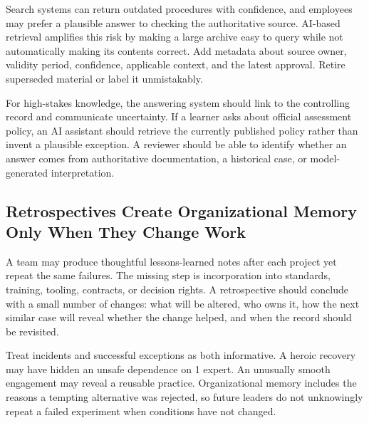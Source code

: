 Search systems can return outdated procedures with confidence, and employees may prefer a plausible answer to checking the authoritative source. AI-based retrieval amplifies this risk by making a large archive easy to query while not automatically making its contents correct. Add metadata about source owner, validity period, confidence, applicable context, and the latest approval. Retire superseded material or label it unmistakably.

For high-stakes knowledge, the answering system should link to the controlling record and communicate uncertainty. If a learner asks about official assessment policy, an AI assistant should retrieve the currently published policy rather than invent a plausible exception. A reviewer should be able to identify whether an answer comes from authoritative documentation, a historical case, or model-generated interpretation.

\subsection{Retrospectives Create Organizational Memory Only When They Change Work}
\label{sec:retrospectives_change_work}

A team may produce thoughtful lessons-learned notes after each project yet repeat the same failures. The missing step is incorporation into standards, training, tooling, contracts, or decision rights. A retrospective should conclude with a small number of changes: what will be altered, who owns it, how the next similar case will reveal whether the change helped, and when the record should be revisited.

Treat incidents and successful exceptions as both informative. A heroic recovery may have hidden an unsafe dependence on 1 expert. An unusually smooth engagement may reveal a reusable practice. Organizational memory includes the reasons a tempting alternative was rejected, so future leaders do not unknowingly repeat a failed experiment when conditions have not changed.
